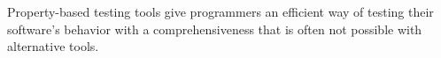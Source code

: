 



Property-based testing tools give programmers
an efficient way of testing their software's behavior with a
comprehensiveness that is often not possible with alternative tools.

